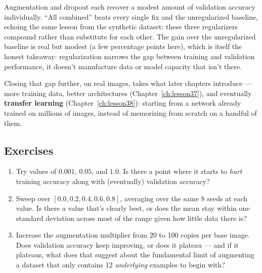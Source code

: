 Augmentation and dropout each recover a modest amount of validation accuracy individually. ``All combined'' beats every single fix and the unregularized baseline, echoing the same lesson from the synthetic dataset: these three regularizers compound rather than substitute for each other. The gain over the unregularized baseline is real but modest (a few percentage points here), which is itself the honest takeaway: regularization narrows the gap between training and validation performance, it doesn't manufacture data or model capacity that isn't there.

Closing that gap further, on real images, takes what later chapters introduce --- more training data, better architectures (Chapter~\ref{ch:lesson37}), and eventually \textbf{transfer learning} (Chapter~\ref{ch:lesson38}): starting from a network already trained on millions of images, instead of memorizing from scratch on a handful of them.

\subsection*{Exercises}
\begin{enumerate}
  \item Try  values of $0.001$, $0.05$, and $1.0$. Is there a point where it starts to \emph{hurt} training accuracy along with (eventually) validation accuracy?
  \item Sweep  over $[0.0, 0.2, 0.4, 0.6, 0.8]$, averaging over the same 8 seeds at each value. Is there a value that's clearly best, or does the mean stay within one standard deviation across most of the range given how little data there is?
  \item Increase the augmentation multiplier from 20 to 100 copies per base image. Does validation accuracy keep improving, or does it plateau --- and if it plateaus, what does that suggest about the fundamental limit of augmenting a dataset that only contains 12 \emph{underlying} examples to begin with?
\end{enumerate}

\vfill
{}
